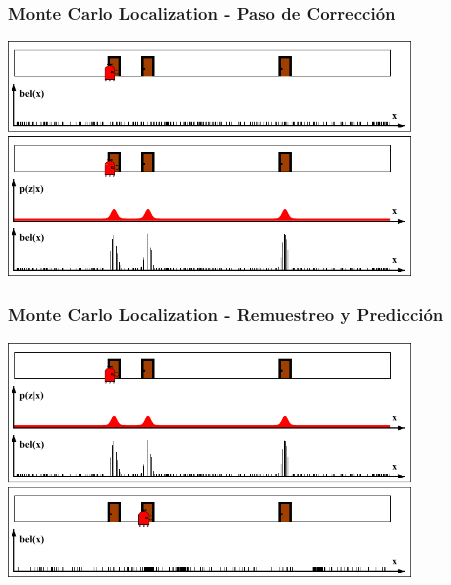 \begin{frame}
    \frametitle{Monte Carlo Localization - Paso de Corrección}

    \begin{center}
        \includegraphics[width=0.8\textwidth]{./images/particle_filter/monte_carlo_correction.pdf}
    \end{center}

\end{frame}

\begin{frame}
    \frametitle{Monte Carlo Localization - Remuestreo y Predicción}

    \begin{center}
        \includegraphics[width=0.8\textwidth]{./images/particle_filter/monte_carlo_resample_and_predict.pdf}
    \end{center}

\end{frame}

